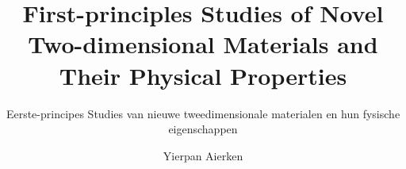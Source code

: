 \title{First-principles Studies of Novel Two-dimensional Materials and Their Physical Properties}

\subtitle{Eerste-principes Studies van nieuwe tweedimensionale materialen en hun fysische eigenschappen}

\renewcommand{\submissiontext}{Proefschrift voorgelegd tot het behalen van de graad van doctor in de
wetenschappen aan de Universiteit Antwerpen te verdedigen door}

\author{Yierpan Aierken}








     

